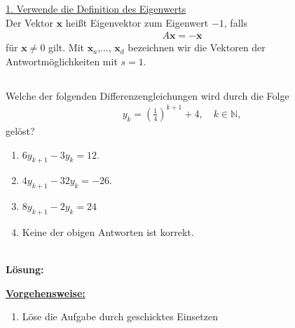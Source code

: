 \underline{1. Verwende die Definition des Eigenwerts}\\
Der Vektor $ \textbf{x} $ heißt Eigenvektor zum Eigenwert $ -1 $, falls
\begin{align*}
	A \textbf{x} = - \textbf{x}
\end{align*}
für $ \textbf{x} \neq 0 $ gilt. Mit $ \textbf{x}_a $,..., $ \textbf{x}_d $ bezeichnen wir die Vektoren der Antwortmöglichkeiten mit $ s = 1 $. 


\newpage

\subsection*{}
Welche der folgenden Differenzengleichungen wird durch die Folge
\begin{align*}
	y_{k} = \left(\frac{1}{4}\right)^{k+1} + 4, \quad k \in \mathbb{N},
\end{align*}
gelöst?
\renewcommand{\labelenumi}{(\alph{enumi})}
\begin{enumerate}
	\item
	$ 6 y_{k+1}  - 3 y_k = 12$.
	\item
	$ 4 y_{k+1} - 32 y_k = -26 $.	
	\item 
	$ 8 y_{k+1} - 2 y_k = 24 $
	\item
	Keine der obigen Antworten ist korrekt.
\end{enumerate}
\ \\
\textbf{Lösung:}
\begin{mdframed}
\underline{\textbf{Vorgehensweise:}}
\renewcommand{\labelenumi}{\theenumi.}
\begin{enumerate}
\item Löse die Aufgabe durch geschicktes Einsetzen
\end{enumerate}
\end{mdframed}

